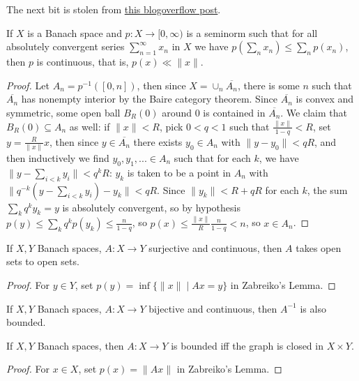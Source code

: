 The next bit is stolen from \href{https://math.blogoverflow.com/2014/06/25/zabreikos-lemma-and-four-fundamental-theorems-of-functional-analysis/}{this blogoverflow post}.

\begin{lem} If $X$ is a Banach space and $p : X \rightarrow [0,\infty)$ is a seminorm such that for all absolutely convergent series $\sum_{n=1}^\infty x_n$ in $X$ we have $p(\sum_n x_n) \le \sum_n p(x_n)$, then $p$ is continuous, that is, $p(x) \ll \|x\|$.
\end{lem}
\begin{proof} Let $A_n = p^{-1}([0,n])$, then since $X = \cup_n \overline{A_n}$, there is some $n$ such that $\overline{A_n}$ has nonempty interior by the Baire category theorem. Since $\overline{A_n}$ is convex and symmetric, some open ball $B_R(0)$ around $0$ is contained in $\overline{A_n}$. We claim that $B_R(0) \subseteq A_n$ as well: if $\|x\| < R$, pick $0 < q < 1$ such that $\frac{\|x\|}{1-q} < R$, set $y = \frac{R}{\|x\|}x$, then since $y \in \overline{A_n}$ there exists $y_0 \in A_n$ with $\|y - y_0\| < qR$, and then inductively we find $y_0, y_1, ... \in A_n$ such that for each $k$, we have $\|y - \sum_{i<k} y_i\| < q^kR$: $y_k$ is taken to be a point in $A_n$ with $\|q^{-k}(y - \sum_{i<k} y_i) - y_k\| < qR$. Since $\|y_k\| < R + qR$ for each $k$, the sum $\sum_k q^k y_k = y$ is absolutely convergent, so by hypothesis $p(y) \le \sum_k q^kp(y_k) \le \frac{n}{1-q}$, so $p(x) \le \frac{\|x\|}{R}\frac{n}{1-q} < n$, so $x \in A_n$.
\end{proof}

\begin{thm} If $X,Y$ Banach spaces, $A:X\rightarrow Y$ surjective and continuous, then $A$ takes open sets to open sets.
\end{thm}
\begin{proof} For $y \in Y$, set $p(y) = \inf \{\|x\| \mid Ax = y\}$ in Zabreiko's Lemma.
\end{proof}

\begin{thm} If $X,Y$ Banach spaces, $A:X\rightarrow Y$ bijective and continuous, then $A^{-1}$ is also bounded.
\end{thm}

\begin{thm} If $X, Y$ Banach spaces, then $A:X\rightarrow Y$ is bounded iff the graph is closed in $X\times Y$.
\end{thm}
\begin{proof} For $x \in X$, set $p(x) = \|Ax\|$ in Zabreiko's Lemma.
\end{proof}

